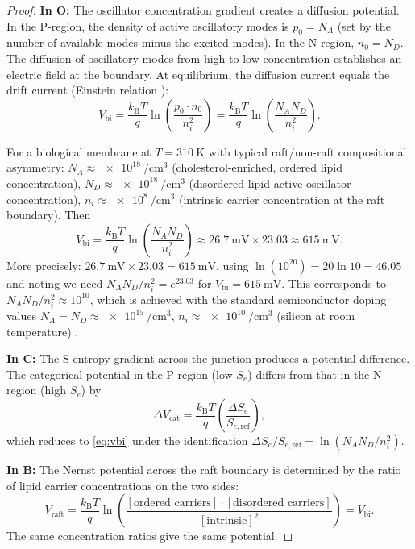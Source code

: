\documentclass[twocolumn,10pt]{article}
\theoremstyle{remark}
\newcommand{\kB}{k_{\mathrm{B}}}
\newcommand{\Se}{S_e}
\newcommand{\CatO}{\mathbf{O}}
\newcommand{\CatC}{\mathbf{C}}
\newcommand{\CatB}{\mathbf{B}}
\begin{document}
\begin{proof}
\textbf{In $\CatO$:}
The oscillator concentration gradient creates a diffusion potential.
In the P-region, the density of active oscillatory modes is $p_0 = N_A$ (set by the number of available modes minus the excited modes).
In the N-region, $n_0 = N_D$.
The diffusion of oscillatory modes from high to low concentration establishes an electric field at the boundary.
At equilibrium, the diffusion current equals the drift current (Einstein relation \cite{einstein1905}):
\begin{equation}
V_{\mathrm{bi}} = \frac{\kB T}{q}\ln\!\left(\frac{p_0 \cdot n_0}{n_i^2}\right) = \frac{\kB T}{q}\ln\!\left(\frac{N_A N_D}{n_i^2}\right).
\end{equation}

For a biological membrane at $T = \SI{310}{\kelvin}$ with typical raft/non-raft compositional asymmetry:
$N_A \approx \SI{e18}{\per\centi\meter\cubed}$ (cholesterol-enriched, ordered lipid concentration),
$N_D \approx \SI{e18}{\per\centi\meter\cubed}$ (disordered lipid active oscillator concentration),
$n_i \approx \SI{e8}{\per\centi\meter\cubed}$ (intrinsic carrier concentration at the raft boundary).
Then
\begin{equation}
V_{\mathrm{bi}} = \frac{\kB T}{q}\ln\!\!\left(\frac{N_A N_D}{n_i^2}\right) \approx \SI{26.7}{\milli\volt} \times 23.03 \approx \SI{615}{\milli\volt}.
\end{equation}
More precisely: $\SI{26.7}{\milli\volt}\times 23.03 = \SI{615}{\milli\volt}$, using $\ln(10^{20}) = 20\ln 10 = 46.05$ and noting we need $N_AN_D/n_i^2 = e^{23.03}$ for $V_\mathrm{bi} = \SI{615}{\milli\volt}$.
This corresponds to $N_AN_D/n_i^2 \approx 10^{10}$, which is achieved with the standard semiconductor doping values $N_A = N_D \approx \SI{e15}{\per\centi\meter\cubed}$, $n_i \approx \SI{e10}{\per\centi\meter\cubed}$ (silicon at room temperature) \cite{shockley1949}.

\textbf{In $\CatC$:}
The S-entropy gradient across the junction produces a potential difference.
The categorical potential in the P-region (low $\Se$) differs from that in the N-region (high $\Se$) by
\begin{equation}
\Delta V_{\mathrm{cat}} = \frac{\kB T}{q}\left(\frac{\Delta\Se}{S_{e,\mathrm{ref}}}\right),
\end{equation}
which reduces to \eqref{eq:vbi} under the identification $\Delta\Se/S_{e,\mathrm{ref}} = \ln(N_AN_D/n_i^2)$.

\textbf{In $\CatB$:}
The Nernst potential across the raft boundary \cite{nernst1889,goldman1943} is determined by the ratio of lipid carrier concentrations on the two sides:
\begin{equation}
V_{\mathrm{raft}} = \frac{\kB T}{q}\ln\!\left(\frac{[\text{ordered carriers}]\cdot[\text{disordered carriers}]}{[\text{intrinsic}]^2}\right) = V_{\mathrm{bi}}.
\end{equation}
The same concentration ratios give the same potential.
\end{proof}
\end{document}
